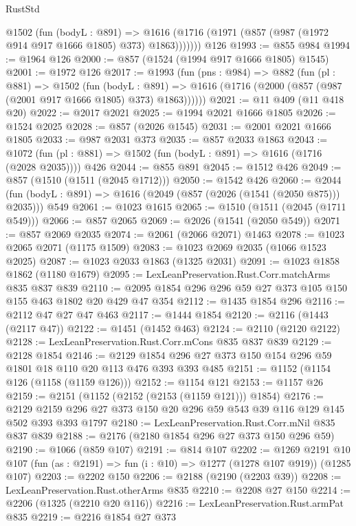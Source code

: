 \begin{lexlean}{RustStd}
\begin{coremodule}
{\begin{coremodule}
{{{{{{{{{        @1502
          (fun (bodyL : @891) =>
          @1616 (@1716 (@1971 (@857 (@987 (@1972 @914 @917 @1666 @1805) @373) @1863)))))))
    @126
@1993 := @855 @984
@1994 := @1964 @126
@2000 := @857 (@1524 (@1994 @917 @1666 @1805) @1545)
@2001 := @1972 @126
@2017 := @1993
    (fun (pns : @984) =>
    @882
      (fun (pl : @881) =>
      @1502
        (fun (bodyL : @891) =>
        @1616 (@1716 (@2000 (@857 (@987 (@2001 @917 @1666 @1805) @373) @1863))))))
@2021 := @11 @409 (@11 @418 @20)
@2022 := @2017 @2021
@2025 := @1994 @2021 @1666 @1805
@2026 := @1524 @2025
@2028 := @857 (@2026 @1545)
@2031 := @2001 @2021 @1666 @1805
@2033 := @987 @2031 @373
@2035 := @857 @2033 @1863
@2043 := @1072 (fun (pl : @881) => @1502 (fun (bodyL : @891) => @1616 (@1716 (@2028 @2035)))) @426
@2044 := @855 @891
@2045 := @1512 @426
@2049 := @857 (@1510 (@1511 (@2045 @1712)))
@2050 := @1542 @426
@2060 := @2044 (fun (bodyL : @891) => @1616 (@2049 (@857 (@2026 (@1541 (@2050 @875))) @2035))) @549
@2061 := @1023 @1615
@2065 := @1510 (@1511 (@2045 (@1711 @549)))
@2066 := @857 @2065
@2069 := @2026 (@1541 (@2050 @549))
@2071 := @857 @2069 @2035
@2074 := @2061 (@2066 @2071) @1463
@2078 := @1023 @2065 @2071 (@1175 @1509)
@2083 := @1023 @2069 @2035 (@1066 @1523 @2025)
@2087 := @1023 @2033 @1863 (@1325 @2031)
@2091 := @1023 @1858 @1862 (@1180 @1679)
@2095 := LexLeanPreservation.Rust.Corr.matchArms @835 @837 @839
@2110 := @2095 @1854 @296 @296 @59 @27 @373 @105 @150 @155 @463 @1802 @20 @429 @47 @354
@2112 := @1435 @1854 @296
@2116 := @2112 @47 @27 @47 @463
@2117 := @1444 @1854
@2120 := @2116 (@1443 (@2117 @47))
@2122 := @1451 (@1452 @463)
@2124 := @2110 (@2120 @2122)
@2128 := LexLeanPreservation.Rust.Corr.mCons @835 @837 @839
@2129 := @2128 @1854
@2146 := @2129 @1854 @296 @27 @373 @150 @154 @296 @59 @1801 @18 @110 @20 @113 @476 @393 @393 @485
@2151 := @1152 (@1154 @126 (@1158 (@1159 @126)))
@2152 := @1154 @121
@2153 := @1157 @26
@2159 := @2151 (@1152 (@2152 (@2153 (@1159 @121))) @1854)
@2176 := @2129 @2159 @296 @27 @373 @150 @20 @296 @59 @543 @39 @116 @129 @145 @502 @393 @393 @1797
@2180 := LexLeanPreservation.Rust.Corr.mNil @835 @837 @839
@2188 := @2176 (@2180 @1854 @296 @27 @373 @150 @296 @59)
@2190 := @1066 (@859 @107)
@2191 := @814 @107
@2202 := @1269
    @2191
    @10
    @107
    (fun (as : @2191) => fun (i : @10) => @1277 (@1278 @107 @919))
    (@1285 @107)
@2203 := @2202 @150
@2206 := @2188 (@2190 (@2203 @39))
@2208 := LexLeanPreservation.Rust.otherArms @835
@2210 := @2208 @27 @150
@2214 := @2206 (@1325 (@2210 @20 @116))
@2216 := LexLeanPreservation.Rust.armPat @835
@2219 := @2216 @1854 @27 @373
}}}}}}}}}
\end{coremodule}}
\end{coremodule}
\end{lexlean}
